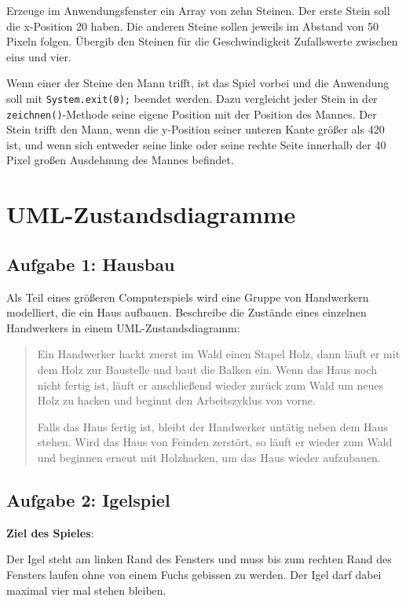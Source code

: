 \begin{compactenum}[a)]
Erzeuge im Anwendungsfenster ein Array von zehn Steinen. Der erste Stein soll
die x-Position 20 haben. Die anderen Steine sollen jeweils im Abstand von 50
Pixeln folgen. Übergib den Steinen für die Geschwindigkeit Zufallswerte
zwischen eins und vier.

\item Wenn einer der Steine den Mann trifft, ist das Spiel vorbei und die
Anwendung soll mit \lstinline|System.exit(0);| beendet werden. Dazu vergleicht
jeder Stein in der \lstinline|zeichnen()|-Methode seine eigene Position mit der
Position des Mannes. Der Stein trifft den Mann, wenn die y-Position seiner
unteren Kante größer als 420 ist, und wenn sich entweder seine linke oder seine
rechte Seite innerhalb der 40 Pixel großen Ausdehnung des Mannes befindet.
\end{compactenum}


\section{UML-Zustandsdiagramme}

\subsection{Aufgabe 1: Hausbau}

Als Teil eines größeren Computerspiels wird eine Gruppe von Handwerkern
modelliert, die ein Haus aufbauen. Beschreibe die Zustände eines einzelnen
Handwerkers in einem UML-Zustandsdiagramm:

\begin{quotation}
\noindent
Ein Handwerker hackt zuerst im Wald einen Stapel Holz, dann läuft er mit dem
Holz zur Baustelle und baut die Balken ein. Wenn das Haus noch nicht fertig
ist, läuft er anschließend wieder zurück zum Wald um neues Holz zu hacken und
beginnt den Arbeitszyklus von vorne.

\noindent
Falls das Haus fertig ist, bleibt der Handwerker untätig neben dem Haus stehen.
Wird das Haus von Feinden zerstört, so läuft er wieder zum Wald und beginnen
erneut mit Holzhacken, um das Haus wieder aufzubauen.
\end{quotation}


\subsection{Aufgabe 2: Igelspiel}

\textbf{Ziel des Spieles}: 

Der Igel steht am linken Rand des Fensters und muss bis zum rechten Rand des
Fensters laufen ohne von einem Fuchs gebissen zu werden. Der Igel darf dabei
maximal vier mal stehen bleiben.

